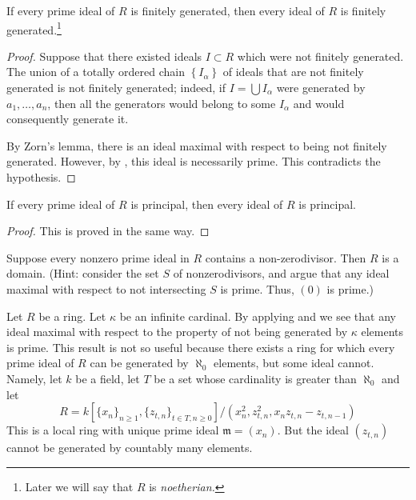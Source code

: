 \begin{corollary}[Cohen] \label{primenoetherian}
If every prime ideal of $R$ is finitely generated, then every ideal of $R$ is
finitely generated.\footnote{Later we will say that $R$ is \emph{noetherian.}} 
\end{corollary} 

\begin{proof} 
Suppose that there existed ideals $I \subset R$ which were not finitely
generated.
The union of a totally ordered chain $\left\{I_\alpha\right\}$ of ideals that
are not finitely generated is not finitely
generated; indeed, if $I = \bigcup I_\alpha$ were generated by $a_1, \dots,
a_n$, then all the generators would belong to some $I_\alpha $ and would
consequently generate it.

By Zorn's lemma, there is an ideal maximal with respect to being not finitely
generated. However, by , this ideal is necessarily
prime. This contradicts the hypothesis.
\end{proof} 

\begin{corollary} 
If every prime ideal of $R$ is principal, then every ideal of $R$ is principal.
\end{corollary} 
\begin{proof} 
This is proved in the same way.
\end{proof} 

\begin{exercise} 
Suppose every nonzero prime ideal in $R$ contains a non-zerodivisor. Then $R$
is a domain. (Hint: consider the set $S$ of nonzerodivisors, and argue that
any ideal maximal with respect to not intersecting $S$ is prime. Thus, $(0)$
is prime.)
\end{exercise} 


\begin{remark}
\label{remark-cohen-bound-cardinality}
Let $R$ be a ring. Let $\kappa$ be an infinite cardinal.
By applying
 and
we see that any ideal maximal with respect to the property of not being
generated by $\kappa$ elements is prime. This result is not so
useful because there exists a ring for which every prime ideal
of $R$ can be generated by $\aleph_0$ elements, but some
ideal cannot. Namely, let $k$ be a field, let $T$ be a set whose
cardinality is greater than $\aleph_0$ and let
\[ R = k[\{x_n\}_{n \geq 1}, \{z_{t, n}\}_{t \in T, n \geq 0}]/
(x_n^2, z_{t, n}^2, x_n z_{t, n} - z_{t, n - 1}) \]
This is a local ring with unique prime ideal
$\mathfrak m = (x_n)$. But the ideal $(z_{t, n})$ cannot
be generated by countably many elements.
\end{remark}

